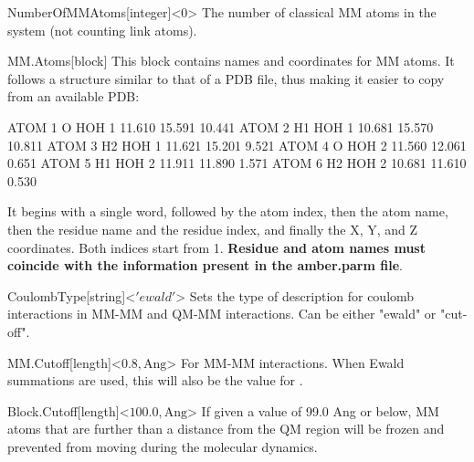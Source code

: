   \begin{fdfentry}{NumberOfMMAtoms}[integer]<$0$>
    The number of classical MM atoms in the system (not counting link atoms).
  \end{fdfentry}

  \begin{fdfentry}{MM.Atoms}[block]
    This block contains names and coordinates for MM atoms. It follows a
    structure similar to that of a PDB file, thus making it easier to copy
    from an available PDB:

    \begin{shellexample}
        ATOM      1  O   HOH     1     11.610  15.591  10.441
        ATOM      2  H1  HOH     1     10.681  15.570  10.811
        ATOM      3  H2  HOH     1     11.621  15.201   9.521
        ATOM      4  O   HOH     2     11.560  12.061   0.651
        ATOM      5  H1  HOH     2     11.911  11.890   1.571
        ATOM      6  H2  HOH     2     10.681  11.610   0.530
    \end{shellexample}

    It begins with a single word, followed by the atom index, then the
    atom name, then the residue name and the residue index, and finally the X,
    Y, and Z coordinates. Both indices start from 1. \textbf{Residue and atom
    names must coincide with the information present in the amber.parm file}.

  \end{fdfentry}

  \begin{fdfentry}{CoulombType}[string]<$'ewald'$>
    Sets the type of description for coulomb interactions in MM-MM and QM-MM
    interactions. Can be either "ewald" or "cut-off".
  \end{fdfentry}

  \begin{fdfentry}{MM.Cutoff}[length]<$0.8,\mathrm{Ang}$>
    For MM-MM interactions. When Ewald summations are used, this will also be
    the value for .
  \end{fdfentry}

  \begin{fdfentry}{Block.Cutoff}[length]<$100.0,\mathrm{Ang}$>
    If given a value of 99.0 Ang or below, MM atoms that are further than a
     distance from the QM region will be frozen and prevented from
    moving during the molecular dynamics.
  \end{fdfentry}

